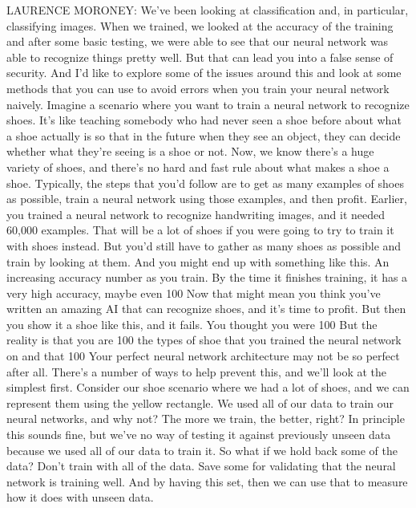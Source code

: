 LAURENCE MORONEY: We've been looking at classification
and, in particular, classifying images.
When we trained, we looked at the accuracy of the training
and after some basic testing, we were able to see that our neural network was
able to recognize things pretty well.
But that can lead you into a false sense of security.
And I'd like to explore some of the issues around this
and look at some methods that you can use to avoid errors when
you train your neural network naively.
Imagine a scenario where you want to train
a neural network to recognize shoes.
It's like teaching somebody who had never seen a shoe before about what
a shoe actually is so that in the future when they see an object,
they can decide whether what they're seeing is a shoe or not.
Now, we know there's a huge variety of shoes,
and there's no hard and fast rule about what makes a shoe a shoe.
Typically, the steps that you'd follow are
to get as many examples of shoes as possible,
train a neural network using those examples, and then profit.
Earlier, you trained a neural network to recognize handwriting images,
and it needed 60,000 examples.
That will be a lot of shoes if you were going
to try to train it with shoes instead.
But you'd still have to gather as many shoes as possible
and train by looking at them.
And you might end up with something like this.
An increasing accuracy number as you train.
By the time it finishes training, it has a very high accuracy, maybe even 100%
Now that might mean you think you've written
an amazing AI that can recognize shoes, and it's time to profit.
But then you show it a shoe like this, and it fails.
You thought you were 100%
But the reality is that you are 100%
the types of shoe that you trained the neural network on
and that 100%
Your perfect neural network architecture may not be so perfect after all.
There's a number of ways to help prevent this, and we'll look at the simplest
first.
Consider our shoe scenario where we had a lot of shoes,
and we can represent them using the yellow rectangle.
We used all of our data to train our neural networks, and why not?
The more we train, the better, right?
In principle this sounds fine, but we've no way
of testing it against previously unseen data
because we used all of our data to train it.
So what if we hold back some of the data?
Don't train with all of the data.
Save some for validating that the neural network is training well.
And by having this set, then we can use that to measure
how it does with unseen data.

